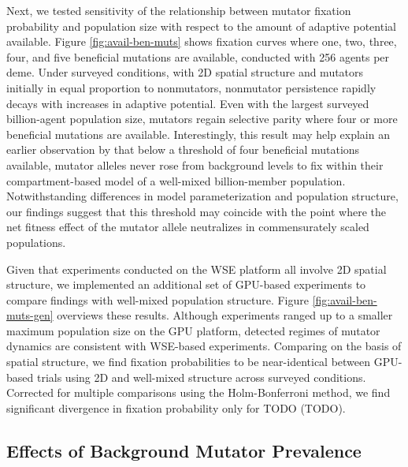 Next, we tested sensitivity of the relationship between mutator fixation probability and population size with respect to the amount of adaptive potential available.
Figure \ref{fig:avail-ben-muts} shows fixation curves where one, two, three, four, and five beneficial mutations are available, conducted with 256 agents per deme.
Under surveyed conditions, with 2D spatial structure and mutators initially in equal proportion to nonmutators, nonmutator persistence rapidly decays with increases in adaptive potential.
Even with the largest surveyed billion-agent population size, mutators regain selective parity where four or more beneficial mutations are available.
Interestingly, this result may help explain an earlier observation by \citet{tenaillon1999mutators} that below a threshold of four beneficial mutations available, mutator alleles never rose from background levels to fix within their compartment-based model of a well-mixed billion-member population.
Notwithstanding differences in model parameterization and population structure, our findings suggest that this threshold may coincide with the point where the net fitness effect of the mutator allele neutralizes in commensurately scaled populations.



Given that experiments conducted on the WSE platform all involve 2D spatial structure, we implemented an additional set of GPU-based experiments to compare findings with well-mixed population structure.
Figure \ref{fig:avail-ben-muts-gen} overviews these results.
Although experiments ranged up to a smaller maximum population size on the GPU platform, detected regimes of mutator dynamics are consistent with WSE-based experiments.
Comparing on the basis of spatial structure, we find fixation probabilities to be near-identical between GPU-based trials using 2D and well-mixed structure across surveyed conditions.
Corrected for multiple comparisons using the Holm-Bonferroni method, we find significant divergence in fixation probability only for TODO (TODO).

\subsection{Effects of Background Mutator Prevalence}
\label{sec:background-hypermutator-prevalence}



